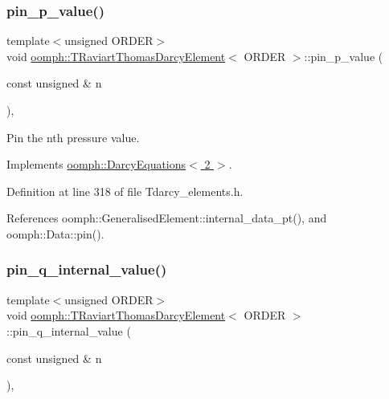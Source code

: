 \subsubsection{\texorpdfstring{pin\+\_\+p\+\_\+value()}{pin\_p\_value()}}
{\footnotesize\ttfamily template$<$unsigned O\+R\+D\+ER$>$ \\
void \hyperlink{classoomph_1_1TRaviartThomasDarcyElement}{oomph\+::\+T\+Raviart\+Thomas\+Darcy\+Element}$<$ O\+R\+D\+ER $>$\+::pin\+\_\+p\+\_\+value (\begin{DoxyParamCaption}\item[{const unsigned \&}]{n }\end{DoxyParamCaption})\hspace{0.3cm}{\ttfamily [inline]}, {\ttfamily [virtual]}}



Pin the nth pressure value. 



Implements \hyperlink{classoomph_1_1DarcyEquations_a93c88bdb79b37be378f5ef4dbe197fa6}{oomph\+::\+Darcy\+Equations$<$ 2 $>$}.



Definition at line 318 of file Tdarcy\+\_\+elements.\+h.



References oomph\+::\+Generalised\+Element\+::internal\+\_\+data\+\_\+pt(), and oomph\+::\+Data\+::pin().

\mbox{\label{classoomph_1_1TRaviartThomasDarcyElement_a26fd22715cc5a27e55bca5d760b822e0}} 
\subsubsection{\texorpdfstring{pin\+\_\+q\+\_\+internal\+\_\+value()}{pin\_q\_internal\_value()}}
{\footnotesize\ttfamily template$<$unsigned O\+R\+D\+ER$>$ \\
void \hyperlink{classoomph_1_1TRaviartThomasDarcyElement}{oomph\+::\+T\+Raviart\+Thomas\+Darcy\+Element}$<$ O\+R\+D\+ER $>$\+::pin\+\_\+q\+\_\+internal\+\_\+value (\begin{DoxyParamCaption}\item[{const unsigned \&}]{n }\end{DoxyParamCaption})\hspace{0.3cm}{\ttfamily [inline]}, {\ttfamily [virtual]}}



